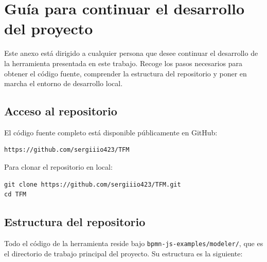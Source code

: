 
\chapter{Guía para continuar el desarrollo del proyecto}
\label{anx:guiaDesarrollo}

Este anexo está dirigido a cualquier persona que desee continuar el desarrollo de la herramienta presentada en este trabajo. Recoge los pasos necesarios para obtener el código fuente, comprender la estructura del repositorio y poner en marcha el entorno de desarrollo local.

\section{Acceso al repositorio}
\label{sec:anx3-repo}

El código fuente completo está disponible públicamente en GitHub:

\begin{lstlisting}[style=promptbox]
https://github.com/sergiiio423/TFM
\end{lstlisting}

Para clonar el repositorio en local:

\begin{lstlisting}[style=promptbox]
git clone https://github.com/sergiiio423/TFM.git
cd TFM
\end{lstlisting}

\section{Estructura del repositorio}
\label{sec:anx3-estructura}

Todo el código de la herramienta reside bajo \texttt{bpmn-js-examples/modeler/}, que es el directorio de trabajo principal del proyecto. Su estructura es la siguiente:

